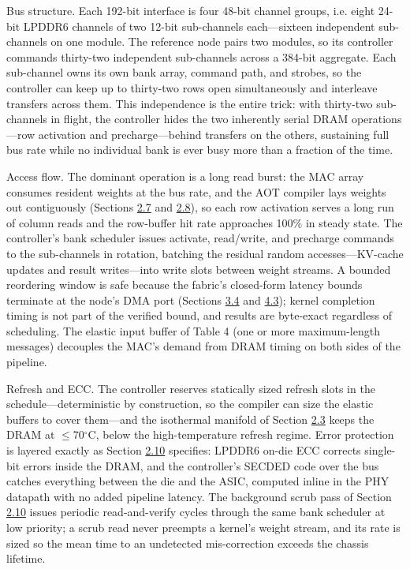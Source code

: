 \documentclass[10pt,twocolumn]{article}
\begin{document}
Bus structure. Each 192-bit interface is four 48-bit channel groups, i.e. eight 24-bit LPDDR6 channels of two 12-bit sub-channels each---sixteen independent sub-channels on one module. The reference node pairs two modules, so its controller commands thirty-two independent sub-channels across a 384-bit aggregate. Each sub-channel owns its own bank array, command path, and strobes, so the controller can keep up to thirty-two rows open simultaneously and interleave transfers across them. This independence is the entire trick: with thirty-two sub-channels in flight, the controller hides the two inherently serial DRAM operations---row activation and precharge---behind transfers on the others, sustaining full bus rate while no individual bank is ever busy more than a fraction of the time.

Access flow. The dominant operation is a long read burst: the MAC array consumes resident weights at the bus rate, and the AOT compiler lays weights out contiguously (Sections \hyperref[sec:2.7]{2.7} and \hyperref[sec:2.8]{2.8}), so each row activation serves a long run of column reads and the row-buffer hit rate approaches 100\% in steady state. The controller's bank scheduler issues activate, read/write, and precharge commands to the sub-channels in rotation, batching the residual random accesses---KV-cache updates and result writes---into write slots between weight streams. A bounded reordering window is safe because the fabric's closed-form latency bounds terminate at the node's DMA port (Sections \hyperref[sec:3.4]{3.4} and \hyperref[sec:4.3]{4.3}); kernel completion timing is not part of the verified bound, and results are byte-exact regardless of scheduling. The elastic input buffer of Table 4 (one or more maximum-length messages) decouples the MAC's demand from DRAM timing on both sides of the pipeline.

Refresh and ECC. The controller reserves statically sized refresh slots in the schedule---deterministic by construction, so the compiler can size the elastic buffers to cover them---and the isothermal manifold of Section \hyperref[sec:2.3]{2.3} keeps the DRAM at $\leq$70$^\circ$C, below the high-temperature refresh regime. Error protection is layered exactly as Section \hyperref[sec:2.10]{2.10} specifies: LPDDR6 on-die ECC corrects single-bit errors inside the DRAM, and the controller's SECDED code over the bus catches everything between the die and the ASIC, computed inline in the PHY datapath with no added pipeline latency. The background scrub pass of Section \hyperref[sec:2.10]{2.10} issues periodic read-and-verify cycles through the same bank scheduler at low priority; a scrub read never preempts a kernel's weight stream, and its rate is sized so the mean time to an undetected mis-correction exceeds the chassis lifetime.
\end{document}
